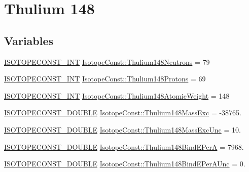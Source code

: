 \hypertarget{group___isotope_const-_thulium-_tm148}{}\section{Thulium 148}
\label{group___isotope_const-_thulium-_tm148}
\subsection*{Variables}
\begin{DoxyCompactItemize}
\item 
\mbox{\hyperlink{group___isotope_const-_macros_ga5f18360b3e99483a35c32d789e62621c}{I\+S\+O\+T\+O\+P\+E\+C\+O\+N\+S\+T\+\_\+\+I\+NT}} \mbox{\hyperlink{group___isotope_const-_thulium-_tm148_gaec9faf77f74639cc66447012ba2c1719}{Isotope\+Const\+::\+Thulium148\+Neutrons}} = 79
\item 
\mbox{\hyperlink{group___isotope_const-_macros_ga5f18360b3e99483a35c32d789e62621c}{I\+S\+O\+T\+O\+P\+E\+C\+O\+N\+S\+T\+\_\+\+I\+NT}} \mbox{\hyperlink{group___isotope_const-_thulium-_tm148_ga8622166a8eae54a820664b4e65a1adb5}{Isotope\+Const\+::\+Thulium148\+Protons}} = 69
\item 
\mbox{\hyperlink{group___isotope_const-_macros_ga5f18360b3e99483a35c32d789e62621c}{I\+S\+O\+T\+O\+P\+E\+C\+O\+N\+S\+T\+\_\+\+I\+NT}} \mbox{\hyperlink{group___isotope_const-_thulium-_tm148_ga87f76ed5ec200c56e974556f2755fff5}{Isotope\+Const\+::\+Thulium148\+Atomic\+Weight}} = 148
\item 
\mbox{\hyperlink{group___isotope_const-_macros_ga8f45a7272ce02c0b4c65c44636ed719a}{I\+S\+O\+T\+O\+P\+E\+C\+O\+N\+S\+T\+\_\+\+D\+O\+U\+B\+LE}} \mbox{\hyperlink{group___isotope_const-_thulium-_tm148_gaed4a6519009057a3007c3d466ca1682e}{Isotope\+Const\+::\+Thulium148\+Mass\+Exc}} = -\/38765.
\item 
\mbox{\hyperlink{group___isotope_const-_macros_ga8f45a7272ce02c0b4c65c44636ed719a}{I\+S\+O\+T\+O\+P\+E\+C\+O\+N\+S\+T\+\_\+\+D\+O\+U\+B\+LE}} \mbox{\hyperlink{group___isotope_const-_thulium-_tm148_gad8392b7290ec642f728275690cdaf690}{Isotope\+Const\+::\+Thulium148\+Mass\+Exc\+Unc}} = 10.
\item 
\mbox{\hyperlink{group___isotope_const-_macros_ga8f45a7272ce02c0b4c65c44636ed719a}{I\+S\+O\+T\+O\+P\+E\+C\+O\+N\+S\+T\+\_\+\+D\+O\+U\+B\+LE}} \mbox{\hyperlink{group___isotope_const-_thulium-_tm148_ga4b2b983d822869bc6d621b76187c827c}{Isotope\+Const\+::\+Thulium148\+Bind\+E\+PerA}} = 7968.
\item 
\mbox{\hyperlink{group___isotope_const-_macros_ga8f45a7272ce02c0b4c65c44636ed719a}{I\+S\+O\+T\+O\+P\+E\+C\+O\+N\+S\+T\+\_\+\+D\+O\+U\+B\+LE}} \mbox{\hyperlink{group___isotope_const-_thulium-_tm148_ga6df212f7d42a24704b4479eb7c016991}{Isotope\+Const\+::\+Thulium148\+Bind\+E\+Per\+A\+Unc}} = 0.

\end{DoxyCompactItemize}
